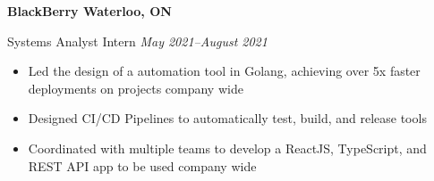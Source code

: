 \textbf{BlackBerry \hfill Waterloo, ON}

Systems Analyst Intern \hfill \textit{May 2021--August 2021}
\begin{itemize}
    \item Led the design of a automation tool in Golang, achieving over 5x faster deployments on projects company wide
    \item Designed CI\slash CD Pipelines to automatically test, build, and release tools
    \item Coordinated with multiple teams to develop a ReactJS, TypeScript, and REST API app to be used company wide
\end{itemize}
